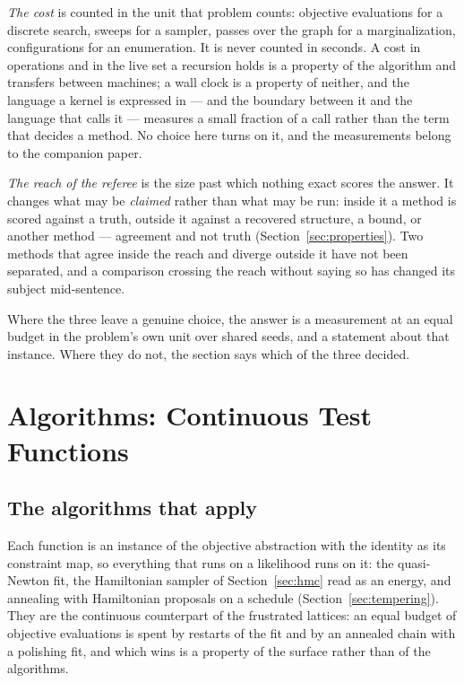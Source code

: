 \documentclass[11pt,a4paper]{article}
\begin{document}
\emph{The cost} is counted in the unit that problem counts: objective
evaluations for a discrete search, sweeps for a sampler, passes over the
graph for a marginalization, configurations for an enumeration. It is never
counted in seconds. A cost in operations and in the live set a recursion holds
is a property of the algorithm and transfers between machines; a wall clock is
a property of neither, and the language a kernel is expressed in --- and the
boundary between it and the language that calls it --- measures a small
fraction of a call rather than the term that decides a method. No choice here
turns on it, and the measurements belong to the companion paper.

\emph{The reach of the referee} is the size past which nothing exact scores the
answer. It changes what may be \emph{claimed} rather than what may be run:
inside it a method is scored against a truth, outside it against a recovered
structure, a bound, or another method --- agreement and not truth
(Section~\ref{sec:properties}). Two methods that agree inside the reach and
diverge outside it have not been separated, and a comparison crossing the reach
without saying so has changed its subject mid-sentence.

Where the three leave a genuine choice, the answer is a measurement at an equal
budget in the problem's own unit over shared seeds, and a statement about that
instance. Where they do not, the section says which of the three decided.

\section{Algorithms: Continuous Test Functions}
\label{sec:testfunctions:algorithms}

\subsection{The algorithms that apply}
Each function is an instance of the objective abstraction with the identity
as its constraint map, so everything that runs on a likelihood runs on it:
the quasi-Newton fit, the Hamiltonian sampler of Section~\ref{sec:hmc} read
as an energy, and annealing with Hamiltonian proposals on a schedule
(Section~\ref{sec:tempering}). They are the continuous counterpart of the
frustrated lattices: an equal budget of objective evaluations is spent by
restarts of the fit and by an annealed chain with a polishing fit, and which
wins is a property of the surface rather than of the algorithms.
\end{document}
